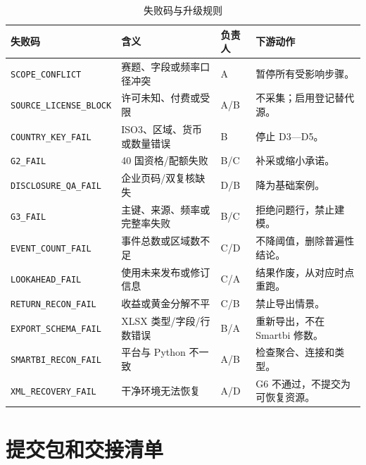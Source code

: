 \documentclass[UTF8,fontset=windows,12pt,openany]{ctexbook}
\newcommand{\Field}[1]{{\small\nolinkurl{#1}}}
\begin{document}
\begin{longtable}{p{3.0cm}p{4.1cm}p{3.2cm}p{3.8cm}}
\caption{失败码与升级规则}\label{tab:failure-codes}\\
\toprule
\textbf{失败码} & \textbf{含义} & \textbf{负责人} & \textbf{下游动作}\\
\midrule
\Field{SCOPE_CONFLICT} & 赛题、字段或频率口径冲突 & A & 暂停所有受影响步骤。\\
\Field{SOURCE_LICENSE_BLOCK} & 许可未知、付费或受限 & A/B & 不采集；启用登记替代源。\\
\Field{COUNTRY_KEY_FAIL} & ISO3、区域、货币或数量错误 & B & 停止 D3—D5。\\
\Field{G2_FAIL} & 40 国资格/配额失败 & B/C & 补采或缩小承诺。\\
\Field{DISCLOSURE_QA_FAIL} & 企业页码/双复核缺失 & D/B & 降为基础案例。\\
\Field{G3_FAIL} & 主键、来源、频率或完整率失败 & B/C & 拒绝问题行，禁止建模。\\
\Field{EVENT_COUNT_FAIL} & 事件总数或区域数不足 & C/D & 不降阈值，删除普遍性结论。\\
\Field{LOOKAHEAD_FAIL} & 使用未来发布或修订信息 & C/A & 结果作废，从对应时点重跑。\\
\Field{RETURN_RECON_FAIL} & 收益或黄金分解不平 & C/B & 禁止导出情景。\\
\Field{EXPORT_SCHEMA_FAIL} & XLSX 类型/字段/行数错误 & B/A & 重新导出，不在 Smartbi 修数。\\
\Field{SMARTBI_RECON_FAIL} & 平台与 Python 不一致 & A/B & 检查聚合、连接和类型。\\
\Field{XML_RECOVERY_FAIL} & 干净环境无法恢复 & A/D & G6 不通过，不提交为可恢复资源。\\
\bottomrule
\end{longtable}

\chapter{提交包和交接清单}
\end{document}
